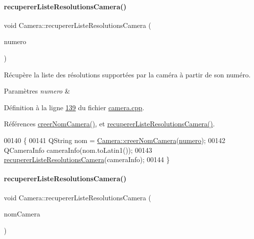 \paragraph{\texorpdfstring{recuperer\+Liste\+Resolutions\+Camera()}{recupererListeResolutionsCamera()}\hspace{0.1cm}{\footnotesize\ttfamily [2/4]}}
{\footnotesize\ttfamily void Camera\+::recuperer\+Liste\+Resolutions\+Camera (\begin{DoxyParamCaption}\item[{int}]{numero }\end{DoxyParamCaption})}



Récupère la liste des résolutions supportées par la caméra à partir de son numéro. 


\begin{DoxyParams}{Paramètres}
{\em numero} & \\
\hline
\end{DoxyParams}


Définition à la ligne \hyperlink{camera_8cpp_source_l00139}{139} du fichier \hyperlink{camera_8cpp_source}{camera.\+cpp}.



Références \hyperlink{camera_8cpp_source_l00293}{creer\+Nom\+Camera()}, et \hyperlink{camera_8cpp_source_l00133}{recuperer\+Liste\+Resolutions\+Camera()}.


\begin{DoxyCode}
00140 \{
00141     QString nom = \hyperlink{class_camera_a506d459df95042a03894afd5b781c2aa}{Camera::creerNomCamera}(\hyperlink{class_camera_ae5cda5df3c9c49b88fff15389a1bbc64}{numero});
00142     QCameraInfo cameraInfo(nom.toLatin1());
00143     \hyperlink{class_camera_a97267488c5756b4217d4e1fbc68008fd}{recupererListeResolutionsCamera}(cameraInfo);
00144 \}
\end{DoxyCode}
\mbox{\label{class_camera_ae3d1ccb26bcd49340bc392dc1e7bb550}} 
\paragraph{\texorpdfstring{recuperer\+Liste\+Resolutions\+Camera()}{recupererListeResolutionsCamera()}\hspace{0.1cm}{\footnotesize\ttfamily [3/4]}}
{\footnotesize\ttfamily void Camera\+::recuperer\+Liste\+Resolutions\+Camera (\begin{DoxyParamCaption}\item[{Q\+String}]{nom\+Camera }\end{DoxyParamCaption})}



